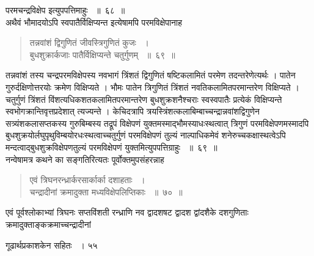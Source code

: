 \documentclass[11pt, openany]{book}
\begin{document}
\begin{sloppypar}
\noindent परमचन्द्रविक्षेप इत्युपपत्तिमाहुः ~॥~६८~॥\\
\noindent अथैवं भौमादयोऽपि स्वपातैर्विक्षिप्यन्त इत्येषामपि परमविक्षेपानाह\textendash
\end{sloppypar}
\begin{quote}

{\ssi तन्नवांशं द्विगुणितं जीवस्त्रिगुणितं कुजः ~।\\
बुधशुक्रार्कजाः पातैर्विक्षिप्यन्ते चतुर्गुणम् ~॥~६९~॥}
\end{quote}
\begin{sloppypar}
तन्नवांशं तस्य चन्द्रपरमविक्षेपस्य नवभागं त्रिंशतं द्विगुणितं षष्टिकलामितं परमेण तदन्तरेणेत्यर्थः । पातेन गुरुर्दक्षिणोत्तरयोः क्रमेण विक्षिप्यते । भौमः पातेन त्रिगुणितं त्रिंशतं नवतिकलामितपरमान्तरेण विक्षिप्यते । चतुर्गुणं त्रिंशतं विंशत्यधिकशतकलामितपरमान्तरेण बुधशुक्रशनैश्चराः स्वस्वपातैः प्रत्येकं विक्षिप्यन्ते स्वभोगक्रान्तिवृत्तप्रदेशात् त्यज्यन्ते । केचिदत्रापि त्रयस्त्रिंशत्कलाबिम्बाच्चन्द्रान्नवांशद्विगुणेन सत्र्यंशकलासप्तकस्य गुरुबिम्बस्य तद्रूपं विक्षेपणं युक्तमस्माद्भौमस्याधःस्थत्वात् त्रिगुणं परमविक्षेपणमस्मादपि बुधशुक्रयोर्लघुपृथुविम्बयोरधःस्थत्वाच्चतुर्गुणं परमविक्षेपणं तुल्यं नाल्पाधिकमेवं शनेरुच्चकक्षास्थत्वेऽपि मन्दत्वाद्बुधशुक्रविक्षेपणतुल्यं परमविक्षेपणं युक्तमित्युपपत्तिग्राहुः ~॥~६९~॥\\ 
\noindent नन्वेषामत्र कथने का सङ्गतिरित्यतः पूर्वोक्तमुपसंहरन्नाह \textendash
\end{sloppypar}
\begin{quote}

{\ssi एवं त्रिघनरन्ध्रार्करसार्कार्का दशाहताः ~।\\
चन्द्रादीनां क्रमादुक्ता मध्यविक्षेपलिप्तिकाः ~॥~७०~॥}
\end{quote}
\begin{sloppypar}
एवं पूर्वश्लोकाभ्यां त्रिघनः सप्तविंशती रन्ध्राणि नव द्वादशषट द्वादश द्वांदशैके दशगुणिताः क्रमादुक्ताङ्कक्रमाच्चन्द्रादीनां
\end{sloppypar}

\newpage

\hspace{3cm}गूढार्थप्रकाशकेन सहितः ~। \hfill ५५
\vspace{1cm}
\end{document}
